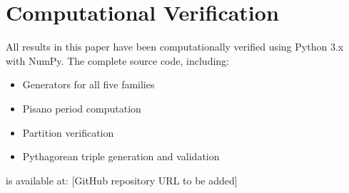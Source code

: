 \documentclass[12pt]{article}
\begin{document}
\appendix

\section{Computational Verification}

All results in this paper have been computationally verified using Python 3.x with NumPy. The complete source code, including:
\begin{itemize}
\item Generators for all five families
\item Pisano period computation
\item Partition verification
\item Pythagorean triple generation and validation
\end{itemize}

is available at: [GitHub repository URL to be added]
\end{document}
